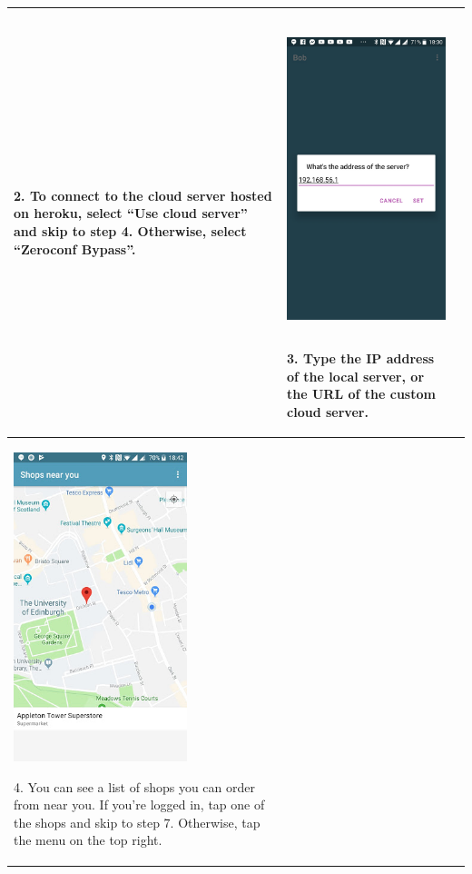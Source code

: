 \documentclass[onecolumn]{IEEEtran}
\begin{document}
\begin{table}[H]
\begin{tabular}{ | m{5.5cm} | m{5.5cm} | m{5.5cm} | }
    2. To connect to the cloud server hosted on heroku, select “Use cloud server” and skip to step 4. Otherwise, select “Zeroconf Bypass”.
    & 
    \begin{minipage}{.31\textwidth}
      \includegraphics[width=\linewidth, height=90mm]{three.jpg}
    \end{minipage}
    3. Type the IP address of the local server, or the URL of the custom cloud server.
    \\ \hline
    \begin{minipage}{.31\textwidth}
      \includegraphics[width=\linewidth, height=90mm]{four.jpg}
    \end{minipage}
    4. You can see a list of shops you can order from near you. If you’re logged in, tap one of the shops and skip to step 7. Otherwise, tap the menu on the top right.
    &
    \begin{minipage}{.31\textwidth}

\end{minipage}
\end{tabular}
\end{table}
\end{document}
